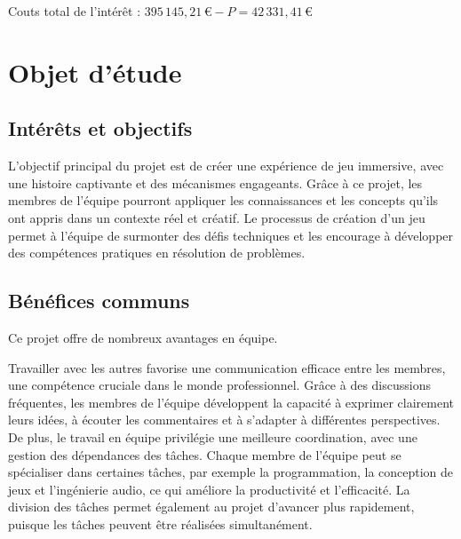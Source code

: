 \documentclass{article}
\begin{document}
Couts total de l'intérêt : $395\,145,21\,\text{€} - P = 42\,331,41\,\text{€}$














\newpage
\section{Objet d’étude}
\subsection{Intérêts et objectifs}\hfill

L'objectif principal du projet est de créer une expérience de jeu immersive, avec une histoire captivante et des mécanismes engageants. Grâce à ce projet, les membres de l'équipe pourront appliquer les connaissances et les concepts qu'ils ont appris dans un contexte réel et créatif. Le processus de création d'un jeu permet à l'équipe de surmonter des défis techniques et les encourage à développer des compétences pratiques en résolution de problèmes.





\subsection{Bénéfices communs}\hfill

Ce projet offre de nombreux avantages en équipe. 

Travailler avec les autres favorise une communication efficace entre les membres, une compétence cruciale dans le monde professionnel. Grâce à des discussions fréquentes, les membres de l’équipe développent la capacité à exprimer clairement leurs idées, à écouter les commentaires et à s’adapter à différentes perspectives.\\

De plus, le travail en équipe privilégie une meilleure coordination, avec une gestion des dépendances des tâches. Chaque membre de l'équipe peut se spécialiser dans certaines tâches, par exemple la programmation, la conception de jeux et l'ingénierie audio, ce qui améliore la productivité et l’efficacité. La division des tâches permet également au projet d’avancer plus rapidement, puisque les tâches peuvent être réalisées simultanément.\\
\end{document}
